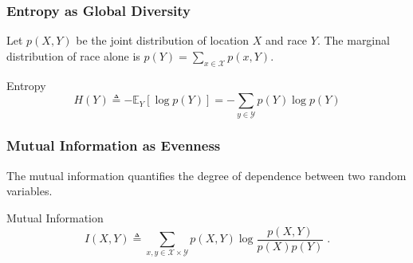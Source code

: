 \documentclass{beamer}
\begin{document}
	\iflong
	\begin{frame}\frametitle{Entropy as Global Diversity}
		Let $p(X,Y)$ be the joint distribution of location $X$ and race $Y$. The marginal distribution of race alone is $p(Y) = \sum_{x \in \mathcal{X}} p(x,Y)$. 
		\begin{block}{Entropy}
			\begin{equation*}
				H(Y) \triangleq - \mathbb{E}_Y[\log p(Y)] = -\sum_{y \in \mathcal{Y}} p(Y)\log p(Y)
			\end{equation*}
		\end{block}
	\end{frame}
	\begin{frame}\frametitle{Mutual Information as Evenness}
		The mutual information quantifies the degree of dependence between two random variables.
		\begin{block}{Mutual Information}
			\begin{equation*}
			I(X,Y) \triangleq \sum_{x,y \in \mathcal{X} \times \mathcal{Y}}p(X,Y) \log \frac{p(X,Y)}{p(X)p(Y)}\;.
		\end{equation*}	
		\end{block}
	\end{frame}
\end{document}
